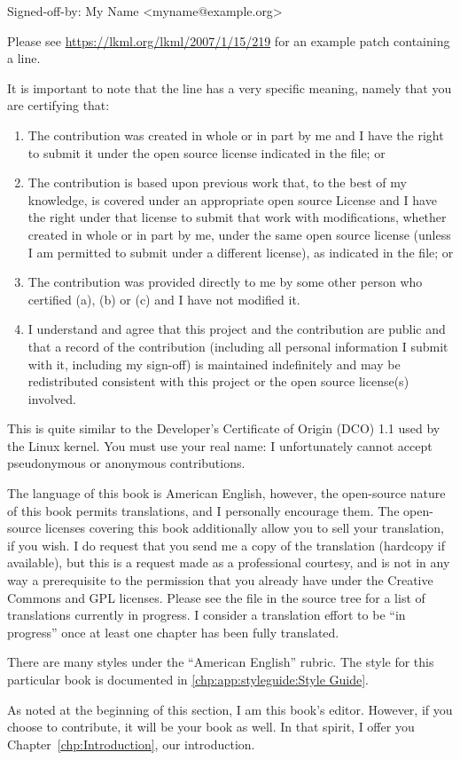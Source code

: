 \begin{VerbatimU}
Signed-off-by: My Name <myname@example.org>
\end{VerbatimU}

Please see \url{https://lkml.org/lkml/2007/1/15/219} for an example
patch containing a  line.

It is important to note that the  line has
a very specific meaning, namely that you are certifying that:

\begin{enumerate}[label={(\alph*)}]
\item	The contribution was created in whole or in part
	by me and I have the right to submit it under
	the open source license indicated in the file; or
\item	The contribution is based upon previous work
	that, to the best of my knowledge, is covered
	under an appropriate open source License and I
	have the right under that license to submit that
	work with modifications, whether created in whole
	or in part by me, under the same open source
	license (unless I am permitted to submit under
	a different license), as indicated in the file; or
\item	The contribution was provided directly to me by
	some other person who certified (a), (b) or (c)
	and I have not modified it.
\item	I understand and agree that this project and the
	contribution are public and that a record of the
	contribution (including all personal information
	I submit with it, including my sign-off) is
	maintained indefinitely and may be redistributed
	consistent with this project or the open source
	license(s) involved.
\end{enumerate}

This is quite similar to the Developer's Certificate of Origin (DCO)
1.1 used by the Linux kernel.
You must use your real name:  I unfortunately cannot accept pseudonymous or
anonymous contributions.

The language of this book is American English, however, the open-source
nature of this book permits translations, and I personally encourage them.
The open-source licenses covering this book additionally allow you
to sell your translation, if you wish.
I do request that you send me a copy of the translation (hardcopy if
available), but this is a request made as a professional courtesy,
and is not in any way a prerequisite to the permission that you already
have under the Creative Commons and GPL licenses.
Please see the  file in the source tree for a list of
translations currently in progress.
I consider a translation effort to be ``in progress'' once at least one
chapter has been fully translated.

There are many styles under the ``American English'' rubric.
The style for this particular book is documented in
\cref{chp:app:styleguide:Style Guide}.

As noted at the beginning of this section, I am this book's editor.
However, if you choose to contribute, it will be your book as well.
In that spirit, I offer you Chapter~\ref{chp:Introduction}, our introduction.

